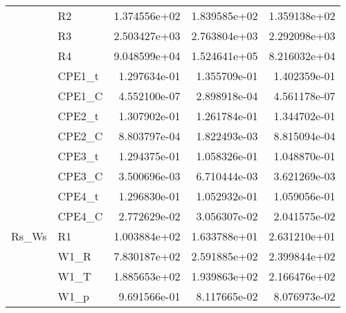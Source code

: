 \begin{tabular}{llrrr}
                    &        R2 & 1.374556e+02 &     1.839585e+02 &              1.359138e+02 \\
                    &        R3 & 2.503427e+03 &     2.763804e+03 &              2.292098e+03 \\
                    &        R4 & 9.048599e+04 &     1.524641e+05 &              8.216032e+04 \\
                    &    CPE1\_t & 1.297634e-01 &     1.355709e-01 &              1.402359e-01 \\
                    &    CPE1\_C & 4.552100e-07 &     2.898918e-04 &              4.561178e-07 \\
                    &    CPE2\_t & 1.307902e-01 &     1.261784e-01 &              1.344702e-01 \\
                    &    CPE2\_C & 8.803797e-04 &     1.822493e-03 &              8.815094e-04 \\
                    &    CPE3\_t & 1.294375e-01 &     1.058326e-01 &              1.048870e-01 \\
                    &    CPE3\_C & 3.500696e-03 &     6.710444e-03 &              3.621269e-03 \\
                    &    CPE4\_t & 1.296830e-01 &     1.052932e-01 &              1.059056e-01 \\
                    &    CPE4\_C & 2.772629e-02 &     3.056307e-02 &              2.041575e-02 \\
              Rs\_Ws &        R1 & 1.003884e+02 &     1.633788e+01 &              2.631210e+01 \\
                    &      W1\_R & 7.830187e+02 &     2.591885e+02 &              2.399844e+02 \\
                    &      W1\_T & 1.885653e+02 &     1.939863e+02 &              2.166476e+02 \\
                    &      W1\_p & 9.691566e-01 &     8.117665e-02 &              8.076973e-02 \\
\bottomrule
\end{tabular}
